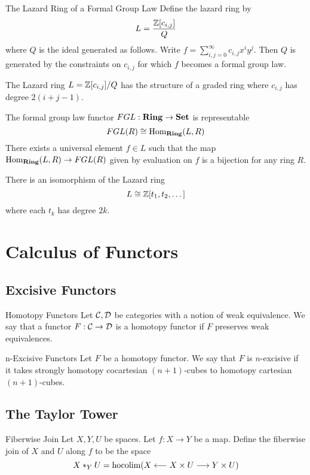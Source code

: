 \documentclass[a4paper]{article}
\begin{document}
\begin{defn}{The Lazard Ring of a Formal Group Law}{} Define the lazard ring by $$L=\frac{\mathbb{Z}[c_{i,j}]}{Q}$$ where $Q$ is the ideal generated as follows. Write $f=\sum_{i,j=0}^\infty c_{i,j}x^iy^j$. Then $Q$ is generated by the constraints on $c_{i,j}$ for which $f$ becomes a formal group law. 
\end{defn}

\begin{lmm}{}{} The Lazard ring $L=\mathbb{Z}[c_{i,j}]/Q$ has the structure of a graded ring where $c_{i,j}$ has degree $2(i+j-1)$. 
\end{lmm}

\begin{thm}{}{} The formal group law functor $FGL:\bold{Ring}\to\bold{Set}$ is representable $$FGL(R)\cong\operatorname{Hom}_\bold{Ring}(L,R)$$ There exists a universal element $f\in L$ such that the map $\operatorname{Hom}_\bold{Ring}(L,R)\to FGL(R)$ given by evaluation on $f$ is a bijection for any ring $R$. 
\end{thm}

\begin{thm}{}{} There is an isomorphism of the Lazard ring $$L\cong\mathbb{Z}[t_1,t_2,\dots]$$ where each $t_k$ has degree $2k$. 
\end{thm}


\pagebreak
\section{Calculus of Functors}
\subsection{Excisive Functors}
\begin{defn}{Homotopy Functors}{} Let $\mathcal{C},\mathcal{D}$ be categories with a notion of weak equivalence. We say that a functor $F:\mathcal{C}\to\mathcal{D}$ is a homotopy functor if $F$ preserves weak equivalences. 
\end{defn}

\begin{defn}{n-Excisive Functors}{} Let $F$ be a homotopy functor. We say that $F$ is $n$-excisive if it takes strongly homotopy cocartesian $(n+1)$-cubes to homotopy cartesian $(n+1)$-cubes. 
\end{defn}

\subsection{The Taylor Tower}
\begin{defn}{Fiberwise Join}{} Let $X,Y,U$ be spaces. Let $f:X\to Y$ be a map. Define the fiberwise join of $X$ and $U$ along $f$ to be the space $$X\ast_YU=\operatorname*{hocolim}(X\longleftarrow X\times U\longrightarrow Y\times U)$$
\end{defn}
\end{document}
